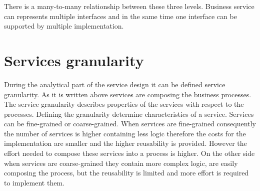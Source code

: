 There is a many-to-many relationship between these three levels. Business service can represents multiple interfaces and in the same time one interface can be supported by multiple implementation.




\bigskip



\section{Services granularity}
\label{sec:granularity}
During the analytical part of the service design it can be defined service granularity. As it is written above services are composing the business processes. The service granularity describes properties of the services with respect to the processes. Defining the granularity determine characteristics of a service. Services can be fine-grained or coarse-grained.
When services are fine-grained consequently the number of services is higher containing less logic therefore the costs for the implementation are smaller and the higher reusability is provided. However the effort needed to compose these services into a process is higher. 
On the other side when services are coarse-grained they contain more complex logic, are easily composing the process, but the reusability is limited and more effort is required to implement them.

